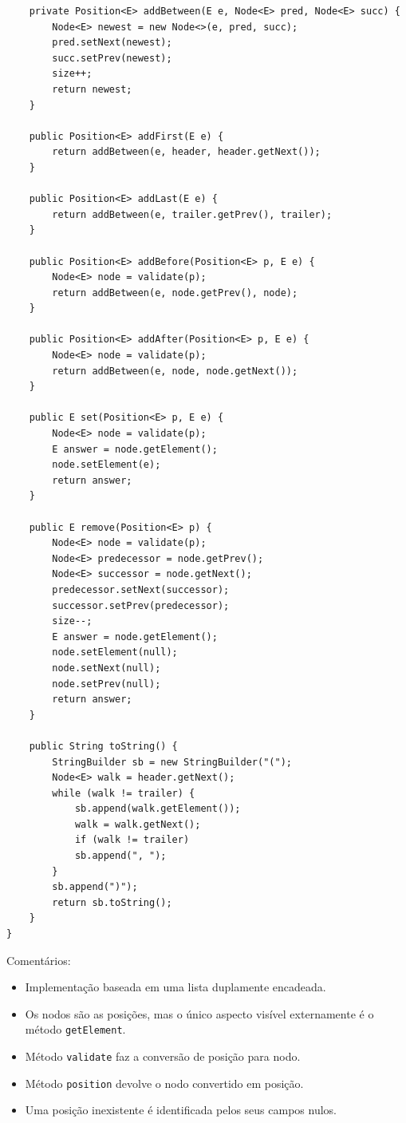 \begin{verbatim}
	private Position<E> addBetween(E e, Node<E> pred, Node<E> succ) {
		Node<E> newest = new Node<>(e, pred, succ);
		pred.setNext(newest);
		succ.setPrev(newest);
		size++;
		return newest;
	}
	
	public Position<E> addFirst(E e) {
		return addBetween(e, header, header.getNext());
	}
	
	public Position<E> addLast(E e) {
		return addBetween(e, trailer.getPrev(), trailer);
	}
	
	public Position<E> addBefore(Position<E> p, E e) {
		Node<E> node = validate(p);
		return addBetween(e, node.getPrev(), node);
	}
	
	public Position<E> addAfter(Position<E> p, E e) {
		Node<E> node = validate(p);
		return addBetween(e, node, node.getNext());
	}
	
	public E set(Position<E> p, E e) {
		Node<E> node = validate(p);
		E answer = node.getElement();
		node.setElement(e);
		return answer;
	}
	
	public E remove(Position<E> p) {
		Node<E> node = validate(p);
		Node<E> predecessor = node.getPrev();
		Node<E> successor = node.getNext();
		predecessor.setNext(successor);
		successor.setPrev(predecessor);
		size--;
		E answer = node.getElement();
		node.setElement(null);
		node.setNext(null);
		node.setPrev(null);
		return answer;
	}
		
	public String toString() {
		StringBuilder sb = new StringBuilder("(");
		Node<E> walk = header.getNext();
		while (walk != trailer) {
			sb.append(walk.getElement());
			walk = walk.getNext();
			if (walk != trailer)
			sb.append(", ");
		}
		sb.append(")");
		return sb.toString();
	}
}
\end{verbatim}

\medskip

{\color{redtext}
Comentários:
\begin{itemize}
	\item Implementação baseada em uma lista duplamente encadeada.
	\item Os nodos são as posições, mas o único aspecto visível externamente é o método \texttt{getElement}.
	\item Método \texttt{validate} faz a conversão de posição para nodo.
	\item Método \texttt{position} devolve o nodo convertido em posição.
	\item Uma posição inexistente é identificada pelos seus campos nulos.
\end{itemize}
}

